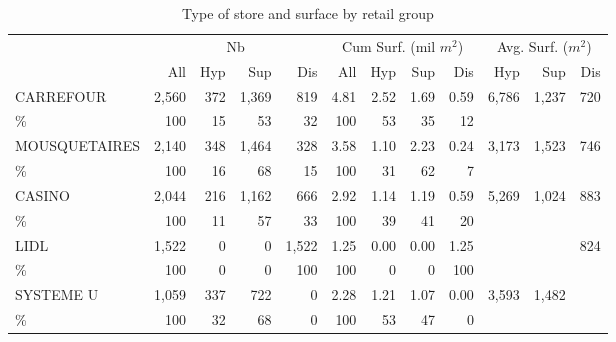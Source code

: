 \documentclass[11pt]{article}
\begin{document}
\begin{table}[H]
\caption{Type of store and surface by retail group}
\footnotesize
\setlength{\tabcolsep}{2pt}

\begin{tabular}{l|rrrr|rrrr|rrr}
\toprule
{}             & \multicolumn{4}{c|}{Nb} &   \multicolumn{4}{c|}{Cum Surf. (mil $m^2$)}   &   \multicolumn{3}{c}{Avg. Surf. ($m^2$)}\\
{}             &        All &  Hyp       &        Sup &       Dis  &      All   & Hyp        &        Sup &        Dis &      Hyp   &       Sup  &    Dis \\
\midrule
CARREFOUR      &      2,560 &        372 &      1,369 &        819 &       4.81 &       2.52 &       1.69 &       0.59 &      6,786 &      1,237 &        720 \\
\%             &        100 &         15 &         53 &         32 &        100 &         53 &         35 &         12 &            &            &            \\
MOUSQUETAIRES  &      2,140 &        348 &      1,464 &        328 &       3.58 &       1.10 &       2.23 &       0.24 &      3,173 &      1,523 &        746 \\
\%             &        100 &         16 &         68 &         15 &        100 &         31 &         62 &          7 &            &            &            \\
CASINO         &      2,044 &        216 &      1,162 &        666 &       2.92 &       1.14 &       1.19 &       0.59 &      5,269 &      1,024 &        883 \\
\%             &        100 &         11 &         57 &         33 &        100 &         39 &         41 &         20 &            &            &            \\
LIDL           &      1,522 &          0 &          0 &      1,522 &       1.25 &       0.00 &       0.00 &       1.25 &            &            &        824 \\
\%             &        100 &          0 &          0 &        100 &        100 &          0 &          0 &        100 &            &            &            \\
SYSTEME U      &      1,059 &        337 &        722 &          0 &       2.28 &       1.21 &       1.07 &       0.00 &      3,593 &      1,482 &            \\
\%             &        100 &         32 &         68 &          0 &        100 &         53 &         47 &          0 &            &            &            \\

\end{tabular}
\end{table}
\end{document}
